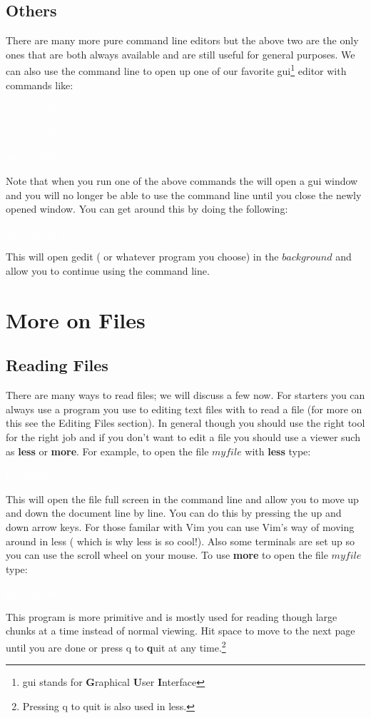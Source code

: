 \documentclass[oneside]{book}
\newcommand{\commandline}[1]{\begin{center} \colorbox{Dark}{\textcolor{white}{#1}} \end{center}}
\begin{document}
\subsection{Others}
There are many more pure command line editors but the above two are the only ones that are both always available and are still useful for general purposes. We can also use the command line to open up one of our favorite gui\footnote{gui stands for \textbf{G}raphical \textbf{U}ser \textbf{I}nterface} editor with commands like: 
\commandline{emacs myfile}
\commandline{gedit myfile}
\commandline{atom myfile}
Note that when you run one of the above commands the will open a gui window and you will no longer be able to use the command line until you close the newly opened window. You can get around this by doing the following:
\commandline{gedit myfile \&}
This will open gedit ( or whatever program you choose) in the $background$ and allow you to continue using the command line. \\


\section{More on Files}

\subsection{Reading Files}
	There are many ways to read files; we will discuss a few now. For starters you can always use a program you use to editing text files with to read a file (for more on this see the Editing Files section). In general though you should use the right tool for the right job and if you don't want to edit a file you should use a viewer such as \textbf{less} or \textbf{more}.
	For example, to open the file $myfile$ with \textbf{less} type:
\commandline{less myfile}
This will open the file full screen in the command line and allow you to move up and down the document line by line. You can do this by pressing the up and down arrow keys. For those familar with Vim you can use Vim's way of moving around in less ( which is why less is so cool!). Also some terminals are set up so you can use the scroll wheel on your mouse.
To use \textbf{more} to open the file $myfile$ type:
\commandline{more myfile}
This program is more primitive and is mostly used for reading though large chunks at a time instead of normal viewing. Hit space to move to the next page until you are done or press q to \textbf{q}uit at any time.\footnote{Pressing q to quit is also used in less.}
\end{document}
